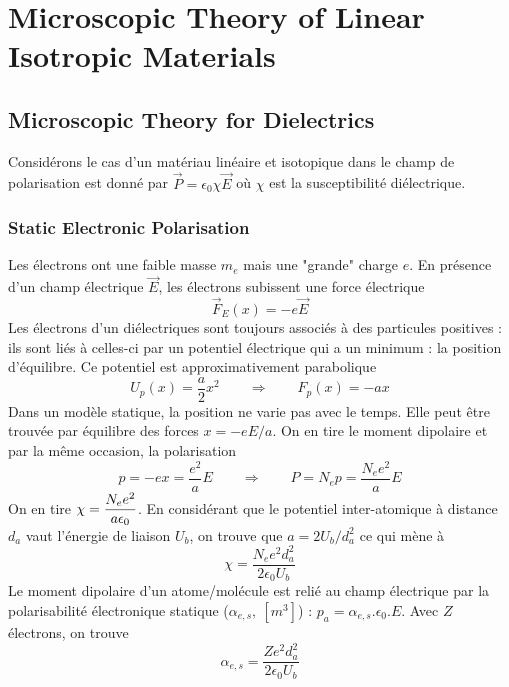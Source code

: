 \chapter{Microscopic Theory of Linear Isotropic Materials}
\setcounter{section}{1}
\section{Microscopic Theory for Dielectrics}
Considérons le cas d'un matériau linéaire et isotopique dans le champ de polarisation est donné
par $\vec{P} = \epsilon_0\chi\vec{E}$ où $\chi$ est la susceptibilité diélectrique.

\subsection{Static Electronic Polarisation}
Les électrons ont une faible masse $m_e$ mais une "grande" charge $e$. En présence d'un champ électrique
$\vec{E}$, les électrons subissent une force électrique
\begin{equation}
\vec F_E(x) = -e\vec E
\end{equation}
Les électrons d'un diélectriques sont toujours associés à des particules positives : ils sont liés à 
celles-ci par un potentiel électrique qui a un minimum : la position d'équilibre. Ce potentiel est 
approximativement parabolique
\begin{equation}
U_p(x) = \dfrac{a}{2}x^2\qquad\Rightarrow\qquad F_p(x) = -ax
\end{equation}
Dans un modèle statique, la position ne varie pas avec le temps. Elle peut être trouvée par équilibre
des forces $x= -eE/a$. On en tire le moment dipolaire et par la même occasion, la polarisation
\begin{equation}
p = -ex = \frac{e^2}{a}E\qquad\Rightarrow\qquad P=N_ep = \frac{N_ee^2}{a}E
\end{equation}
On en tire $\displaystyle \chi = \dfrac{N_ee^2}{a\epsilon_0}$. En considérant que le potentiel inter-atomique à 
distance $d_a$ vaut l'énergie de liaison $U_b$, on trouve que $a=2U_b/d_a^2$ ce qui mène à
\begin{equation}
\chi = \dfrac{N_ee^2d_a^2}{2\epsilon_0U_b}
\end{equation}
Le moment dipolaire d'un atome/molécule est relié au champ électrique par la polarisabilité 
électronique statique ($\alpha_{e,s},\ [m^3]$) : $p_a=\alpha_{e,s}.\epsilon_0.E$. Avec $Z$ électrons,
on trouve
\begin{equation}
\alpha_{e,s} = \dfrac{Ze^2d_a^2}{2\epsilon_0U_b}
\end{equation}

